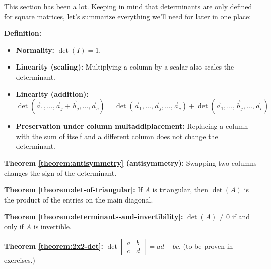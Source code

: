 \documentclass[11pt, letterpaper]{report}
\newenvironment{notes}{}{}
\newcounter{exercise}[section]
\newcounter{theorem}[chapter]
\newlength\oldfboxsep%
\newlength\myminiwidth%
\newenvironment{bbox}{%
  \setlength\oldfboxsep\fboxsep
  \setlength{\fboxsep}{.1in}%
  \setlength\myminiwidth\linewidth%
  \addtolength\myminiwidth{-0.2in}%
  \vspace{0.1in}%
  \begin{lrbox}{\bboxbox}\begin{minipage}{\myminiwidth}%
    }{%
    \end{minipage}\end{lrbox}%
  \noindent\fbox{\usebox{\bboxbox}}\vspace{0.1in}\setlength\fboxsep\oldfboxsep%
}
\begin{document}
This section has been a lot. Keeping in mind that determinants are only defined for square matrices, let's summarize everything we'll need for later in one place:

\begin{bbox}
\textbf{Definition:} 
\begin{itemize}
\item \textbf{Normality:} $\det(I) = 1$.
\item \textbf{Linearity (scaling):} Multiplying a column by a scalar also scales the determinant.

\item \textbf{Linearity (addition):} 
\[\det(\vec{a}_1, \ldots, \vec{a}_j+\vec{b}_j,\ldots, \vec{a}_c) = \det(\vec{a}_1, \ldots, \vec{a}_j,\ldots, \vec{a}_c) + \det(\vec{a}_1, \ldots, \vec{b}_j,\ldots, \vec{a}_c)\]
\item \textbf{Preservation under column multaddiplacement:} Replacing a column with the sum of itself and a different column does not change the determinant.

\end{itemize}

\textbf{Theorem \ref{theorem:antisymmetry} (antisymmetry):} Swapping two columns changes the sign of the determinant.

\textbf{Theorem \ref{theorem:det-of-triangular}:} If $A$ is triangular, then $\det(A)$ is the product of the entries on the main diagonal.

\textbf{Theorem \ref{theorem:determinants-and-invertibility}:} $\det(A) \ne 0$ if and only if $A$ is invertible.

\textbf{Theorem \ref{theorem:2x2-det}:}  $\det\begin{bmatrix}
a & b \\
c & d
\end{bmatrix} = ad-bc.$ (to be proven in exercises.)
\end{bbox}

\begin{notes}
\end{notes}
\end{document}
